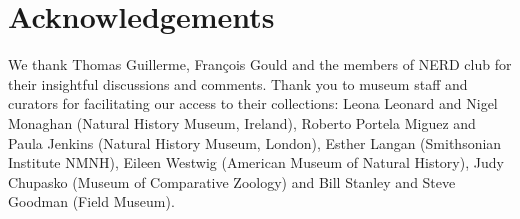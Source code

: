 \documentclass[12pt,a4paper]{article}
\begin{document}
\section{Acknowledgements}
	We thank Thomas Guillerme, Fran\c{c}ois Gould and the members of NERD club for their insightful discussions and comments. Thank you to museum staff and curators for facilitating our access to their collections: Leona Leonard and Nigel Monaghan (Natural History Museum, Ireland), Roberto Portela Miguez and Paula Jenkins (Natural History Museum, London), Esther Langan (Smithsonian Institute NMNH), Eileen Westwig (American Museum of Natural History), Judy Chupasko (Museum of Comparative Zoology) and Bill Stanley and Steve Goodman (Field Museum).

 


 
\end{document}
